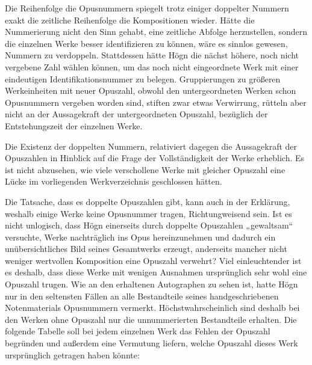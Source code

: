 \documentclass[a4paper]{article}
\begin{document}
Die Reihenfolge die Opusnummern spiegelt trotz einiger doppelter Nummern
exakt die zeitliche Reihenfolge die Kompositionen wieder. Hätte die
Nummerierung nicht den Sinn gehabt, eine zeitliche Abfolge
herzustellen, sondern die einzelnen Werke besser identifizieren zu
können, wäre es sinnlos gewesen, Nummern zu verdoppeln. Stattdessen
hätte Högn die nächst höhere, noch nicht vergebene Zahl wählen können,
um das noch nicht eingeordnete Werk mit einer eindeutigen
Identifikationsnummer zu belegen. Gruppierungen zu größeren
Werkeinheiten mit neuer Opuszahl, obwohl den untergeordneten Werken
schon Opusnummern vergeben worden sind, stiften zwar etwas Verwirrung,
rütteln aber nicht an der Aussagekraft der untergeordneten Opuszahl,
bezüglich der Entstehungszeit der einzelnen Werke.

Die Existenz der doppelten Nummern, relativiert dagegen die Aussagekraft
der Opuszahlen in Hinblick auf die Frage der Vollständigkeit der Werke
erheblich. Es ist nicht abzusehen, wie viele verschollene Werke mit
gleicher Opuszahl eine Lücke im vorliegenden Werkverzeichnis
geschlossen hätten.

Die Tatsache, dass es doppelte Opuszahlen gibt, kann auch in der
Erklärung, weshalb einige Werke keine Opusnummer tragen,
Richtungweisend sein. Ist es nicht unlogisch, dass Högn einerseits
durch doppelte Opuszahlen „gewaltsam“ versuchte, Werke nachträglich ins
Opus hereinzunehmen und dadurch ein unübersichtliches Bild seines
Gesamtwerks erzeugt, anderseits mancher nicht weniger wertvollen
Komposition eine Opuszahl verwehrt? Viel einleuchtender ist es deshalb,
dass diese Werke mit wenigen Ausnahmen ursprünglich sehr wohl eine
Opuszahl trugen. Wie an den erhaltenen Autographen zu sehen ist, hatte
Högn nur in den seltensten Fällen an alle Bestandteile seines
handgeschriebenen Notenmaterials Opusnummern vermerkt.
Höchstwahrscheinlich sind deshalb bei den Werken ohne Opuszahl nur die
unnummerierten Bestandteile erhalten. Die folgende Tabelle soll bei
jedem einzelnen Werk das Fehlen der Opuszahl begründen und außerdem
eine Vermutung liefern, welche Opuszahl dieses Werk ursprünglich
getragen haben könnte:
\end{document}
